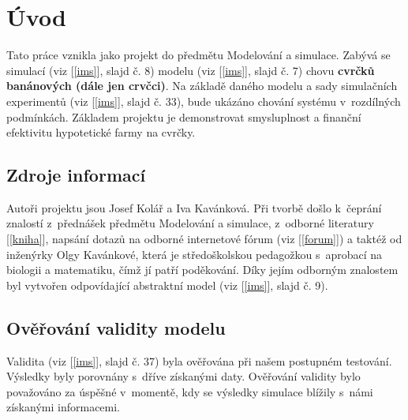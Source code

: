 \documentclass[11pt, a4paper, titlepage]{article}
\begin{document}
    
    \pagestyle{fancy}
    \tableofcontents
    \pagebreak

    \section{Úvod}
    Tato práce vznikla jako projekt do předmětu Modelování a simulace. Zabývá se simulací (viz [\ref{ims}], slajd č. 8)
    modelu (viz [\ref{ims}], slajd č. 7) chovu \textbf{cvrčků banánových (dále jen crvčci)}. Na základě daného modelu a sady
    simulačních experimentů (viz [\ref{ims}], slajd č. 33), bude ukázáno chování systému v~rozdílných podmínkách.
    Základem projektu je demonstrovat smysluplnost a finanční efektivitu hypotetické farmy na cvrčky.

    \subsection{Zdroje informací}
    Autoři projektu jsou Josef Kolář a Iva Kavánková. Při tvorbě došlo k~čeprání znalostí z~přednášek předmětu Modelování a simulace, z~odborné literatury
    [\ref{kniha}], napsání dotazů na odborné internetové fórum (viz [\ref{forum}]) a taktéž od inženýrky Olgy Kavánkové,
    která je středoškolskou pedagožkou s~aprobací na biologii a matematiku, čímž jí patří poděkování.
    Díky jejím odborným znalostem byl vytvořen odpovídající abstraktní model (viz [\ref{ims}], slajd č. 9).

    \subsection{Ověřování validity modelu}
    Validita (viz [\ref{ims}], slajd č. 37) byla ověřována při našem postupném testování. Výsledky byly porovnány s~dříve získanými daty.
    Ověřování validity bylo považováno za úspěšné v~momentě, kdy se výsledky simulace blížily s~námi získanými informacemi.
\end{document}
